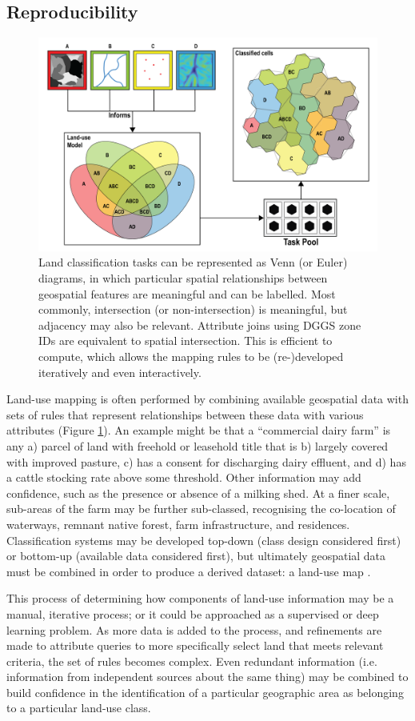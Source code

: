 \documentclass[]{interact}
\theoremstyle{plain}%
\theoremstyle{definition}
\theoremstyle{remark}
\begin{document}
\subsection{Reproducibility}

\begin{figure}[t]
    \centering
    \includegraphics[width=0.65\linewidth]{images/DGGS_lu-03.png}
    \caption{Land classification tasks can be represented as Venn (or Euler) diagrams, in which particular spatial relationships between geospatial features are meaningful and can be labelled. Most commonly, intersection (or non-intersection) is meaningful, but adjacency may also be relevant. Attribute joins using \ac{DGGS} zone IDs are equivalent to spatial intersection. This is efficient to compute, which allows the mapping rules to be (re-)developed iteratively and even interactively.}
    \label{fig:Reproducible}
\end{figure}

Land-use mapping is often performed by combining available geospatial data with sets of rules that represent relationships between these data with various attributes (Figure \ref{fig:Reproducible}). An example might be that a ``commercial dairy farm'' is any a) parcel of land with freehold or leasehold title that is b) largely covered with improved pasture, c) has a consent for discharging dairy effluent, and d) has a cattle stocking rate above some threshold. Other information may add confidence, such as the presence or absence of a milking shed. At a finer scale, sub-areas of the farm may be further sub-classed, recognising the co-location of waterways, remnant native forest, farm infrastructure, and residences. Classification systems may be developed top-down (class design considered first) or bottom-up (available data considered first), but ultimately geospatial data must be combined in order to produce a derived dataset: a land-use map \citep{rutledge2009geospatial}.

This process of determining how components of land-use information may be a manual, iterative process; or it could be approached as a supervised or deep learning problem. As more data is added to the process, and refinements are made to attribute queries to more specifically select land that meets relevant criteria, the set of rules becomes complex. Even redundant information (i.e. information from independent sources about the same thing) may be combined to build confidence in the identification of a particular geographic area as belonging to a particular land-use class.
\end{document}
